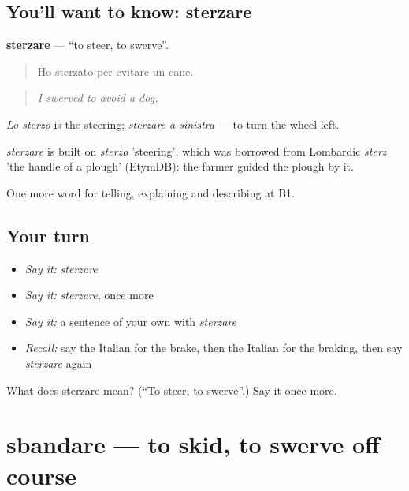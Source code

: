 \subsection*{You'll want to know: sterzare}
\textbf{sterzare} — \textquotedblleft{}to steer, to swerve\textquotedblright{}.

\begin{quote}
Ho sterzato per evitare un cane.
\end{quote}

\begin{quote}
\emph{I swerved to avoid a dog.}
\end{quote}

\emph{Lo sterzo} is the steering; \emph{sterzare a sinistra} — to turn the wheel left.

\begin{cousinweb}
\emph{sterzare} is built on \emph{sterzo} 'steering', which was borrowed from Lombardic \emph{sterz} 'the handle of a plough' (EtymDB): the farmer guided the plough by it.
\end{cousinweb}

\begin{grammarlens}[title={What you've built}]
One more word for telling, explaining and describing at B1.
\end{grammarlens}

\subsection*{Your turn}
\begin{itemize}
\raggedright
  \item \emph{Say it:} \emph{sterzare}
  \item \emph{Say it:} \emph{sterzare}, once more
  \item \emph{Say it:} a sentence of your own with \emph{sterzare}
  \item \emph{Recall:} say the Italian for the brake, then the Italian for the braking, then say \emph{sterzare} again
\end{itemize}

\begin{tcolorbox}[breakable,colback=teal!4,colframe=teal!35!black,title={Before you move on}]
What does sterzare mean? (\textquotedblleft{}To steer, to swerve\textquotedblright{}.) Say it once more.
\end{tcolorbox}
\section[sbandare]{sbandare — to skid, to swerve off course}

